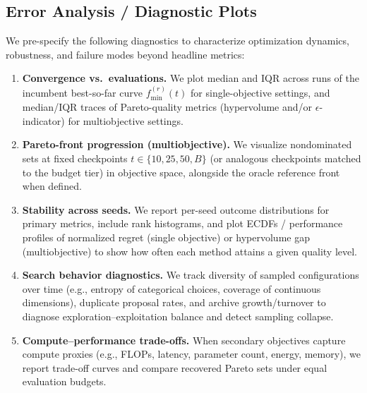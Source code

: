\subsection{Error Analysis / Diagnostic Plots}
\label{subsec:diagnostics}

We pre-specify the following diagnostics to characterize optimization dynamics, robustness, and failure modes beyond headline metrics:
\begin{enumerate}
    \item \textbf{Convergence vs.\ evaluations.}
    We plot median and IQR across runs of the incumbent best-so-far curve \(f_{\min}^{(r)}(t)\) for single-objective settings,
    and median/IQR traces of Pareto-quality metrics (hypervolume and/or \(\epsilon\)-indicator) for multiobjective settings.

    \item \textbf{Pareto-front progression (multiobjective).}
    We visualize nondominated sets at fixed checkpoints \(t \in \{10,25,50,B\}\) (or analogous checkpoints matched to the budget tier)
    in objective space, alongside the oracle reference front when defined.

    \item \textbf{Stability across seeds.}
    We report per-seed outcome distributions for primary metrics, include rank histograms, and plot ECDFs / performance profiles of
    normalized regret (single objective) or hypervolume gap (multiobjective) to show how often each method attains a given quality level.

    \item \textbf{Search behavior diagnostics.}
    We track diversity of sampled configurations over time (e.g., entropy of categorical choices, coverage of continuous dimensions),
    duplicate proposal rates, and archive growth/turnover to diagnose exploration--exploitation balance and detect sampling collapse.

    \item \textbf{Compute--performance trade-offs.}
    When secondary objectives capture compute proxies (e.g., FLOPs, latency, parameter count, energy, memory),
    we report trade-off curves and compare recovered Pareto sets under equal evaluation budgets.
\end{enumerate}

